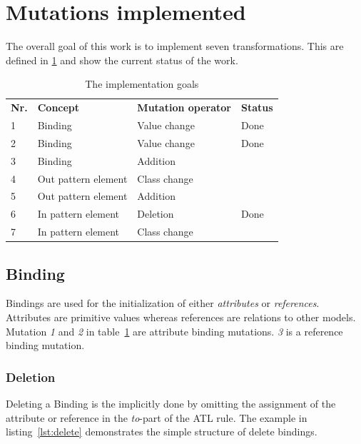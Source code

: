 \documentclass{llncs}
\begin{document}
\section{Mutations implemented}

The overall goal of this work is to implement seven transformations. This are defined in \ref{tbl:goals} and show the current status of the work.

\begin{table}[h]
\begin{tabular}{llll}
\textbf{Nr.} & \textbf{Concept}    & \textbf{Mutation operator} & \textbf{Status} \\
1            & Binding             & Value change               & Done            \\
2            & Binding             & Value change               & Done            \\
3            & Binding             & Addition                   &                 \\
4            & Out pattern element & Class change               &                 \\
5            & Out pattern element & Addition                   &                 \\
6            & In pattern element  & Deletion                   & Done            \\
7            & In pattern element  & Class change               &                
\label{tbl:goals}
\end{tabular}
\caption{The implementation goals}
\end{table}

\subsection{Binding}

Bindings are used for the initialization of either \emph{attributes} or \emph{references}. Attributes are primitive values whereas references are relations to other models. Mutation \emph{1} and \emph{2} in table~\ref{tbl:goals} are attribute binding mutations. \emph{3} is a reference binding mutation.

\subsubsection{Deletion}

Deleting a Binding is the implicitly done by omitting the assignment of the attribute or reference in the \emph{to}-part of the ATL rule. The example in listing~\ref{lst:delete} demonstrates the simple structure of delete bindings.
\end{document}
